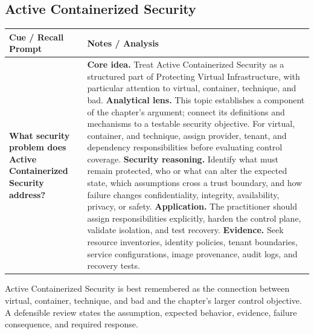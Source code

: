 \documentclass[11pt]{article}
\newcommand{\CornellHeader}{%
\rowcolor{Navy}\color{white}\bfseries Cue / Recall Prompt & \color{white}\bfseries Notes / Analysis\\\hline}
\newcommand{\CornellRow}[2]{%
\cellcolor{CueGray}\RaggedRight\textbf{#1} & \RaggedRight #2\\\hline}
\begin{document}
\subsection*{Active Containerized Security}
\begin{longtable}{>{\RaggedRight\arraybackslash}p{}|>{\RaggedRight\arraybackslash}p{}}
\CornellHeader
\CornellRow{What security problem does Active Containerized Security address?}{\textbf{Core idea.} Treat Active Containerized Security as a structured part of Protecting Virtual Infrastructure, with particular attention to virtual, container, technique, and bad. \textbf{Analytical lens.} This topic establishes a component of the chapter's argument; connect its definitions and mechanisms to a testable security objective. For virtual, container, and technique, assign provider, tenant, and dependency responsibilities before evaluating control coverage. \textbf{Security reasoning.} Identify what must remain protected, who or what can alter the expected state, which assumptions cross a trust boundary, and how failure changes confidentiality, integrity, availability, privacy, or safety. \textbf{Application.} The practitioner should assign responsibilities explicitly, harden the control plane, validate isolation, and test recovery. \textbf{Evidence.} Seek resource inventories, identity policies, tenant boundaries, service configurations, image provenance, audit logs, and recovery tests.}
\end{longtable}
\begin{topicsummary}
Active Containerized Security is best remembered as the connection between virtual, container, technique, and bad and the chapter's larger control objective. A defensible review states the assumption, expected behavior, evidence, failure consequence, and required response.
\end{topicsummary}
\end{document}
